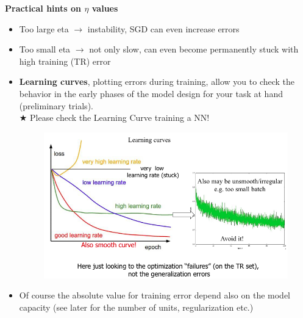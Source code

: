\documentclass[../main.tex]{subfiles}
\begin{document}
\textbf{Practical hints on $\eta$ values}
\begin{itemize}

    \item Too large eta $\rightarrow$ instability, SGD can even increase errors
    
    \item Too small eta $\rightarrow$ not only slow, can even become permanently stuck 
    with high training (TR) error
    
    \item \textbf{Learning curves}, plotting errors during training, allow you to check the behavior in the early phases of the model design for your task at hand (preliminary trials).\\
    $\bigstar$ Please check the Learning Curve training a NN!
    \begin{figure}[H]
        \centering
        \includegraphics[scale = 0.44]{lectures/4_neural_networks/4_learning_curves.png}
    \end{figure}
    
    \item Of course the absolute value for training error depend also on the model capacity (see later for the number of units, regularization etc.)
    

\end{itemize}
\end{document}
